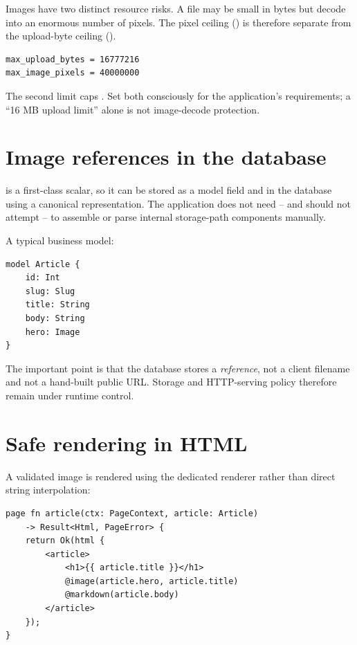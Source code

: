 Images have two distinct resource risks. A file may be small in bytes but decode into an enormous number of pixels. The pixel ceiling () is therefore separate from the upload-byte ceiling ().

\begin{lstlisting}
max_upload_bytes = 16777216
max_image_pixels = 40000000
\end{lstlisting}

The second limit caps . Set both consciously for the application's requirements; a ``16 MB upload limit'' alone is not image-decode protection.

\section{Image references in the database}

 is a first-class scalar, so it can be stored as a model field and in the database using a canonical representation. The application does not need -- and should not attempt -- to assemble or parse internal storage-path components manually.

A typical business model:

\begin{lstlisting}[language=RWLang]
model Article {
    id: Int
    slug: Slug
    title: String
    body: String
    hero: Image
}
\end{lstlisting}

The important point is that the database stores a \emph{reference}, not a client filename and not a hand-built public URL. Storage and HTTP-serving policy therefore remain under runtime control.

\newpage
\section{Safe rendering in HTML}

A validated image is rendered using the dedicated renderer rather than direct string interpolation:

\begin{lstlisting}[language=RWLang]
page fn article(ctx: PageContext, article: Article)
    -> Result<Html, PageError> {
    return Ok(html {
        <article>
            <h1>{{ article.title }}</h1>
            @image(article.hero, article.title)
            @markdown(article.body)
        </article>
    });
}
\end{lstlisting}

